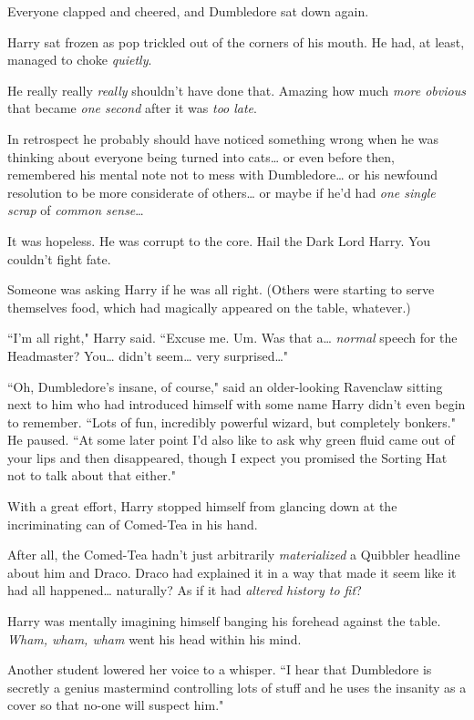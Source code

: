Everyone clapped and cheered, and Dumbledore sat down again.

Harry sat frozen as pop trickled out of the corners of his mouth. He had, at least, managed to choke \emph{quietly}.

He really really \emph{really} shouldn't have done that. Amazing how much \emph{more obvious} that became \emph{one second} after it was \emph{too late}.

In retrospect he probably should have noticed something wrong when he was thinking about everyone being turned into cats{\ldots} or even before then, remembered his mental note not to mess with Dumbledore{\ldots} or his newfound resolution to be more considerate of others{\ldots} or maybe if he'd had \emph{one single scrap} of \emph{common sense}{\ldots}

It was hopeless. He was corrupt to the core. Hail the Dark Lord Harry. You couldn't fight fate.

Someone was asking Harry if he was all right. (Others were starting to serve themselves food, which had magically appeared on the table, whatever.)

``I'm all right," Harry said. ``Excuse me. Um. Was that a{\ldots} \emph{normal} speech for the Headmaster? You{\ldots} didn't seem{\ldots} very surprised{\ldots}"

``Oh, Dumbledore's insane, of course," said an older-looking Ravenclaw sitting next to him who had introduced himself with some name Harry didn't even begin to remember. ``Lots of fun, incredibly powerful wizard, but completely bonkers." He paused. ``At some later point I'd also like to ask why green fluid came out of your lips and then disappeared, though I expect you promised the Sorting Hat not to talk about that either."

With a great effort, Harry stopped himself from glancing down at the incriminating can of Comed-Tea in his hand.

After all, the Comed-Tea hadn't just arbitrarily \emph{materialized} a Quibbler headline about him and Draco. Draco had explained it in a way that made it seem like it had all happened{\ldots} naturally? As if it had \emph{altered history to fit}?

Harry was mentally imagining himself banging his forehead against the table. \emph{Wham, wham, wham} went his head within his mind.

Another student lowered her voice to a whisper. ``I hear that Dumbledore is secretly a genius mastermind controlling lots of stuff and he uses the insanity as a cover so that no-one will suspect him."

